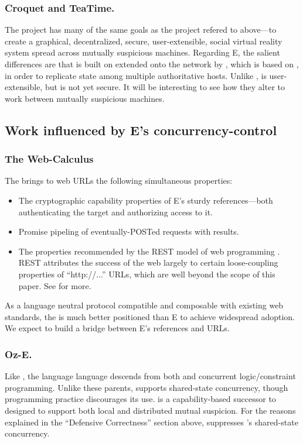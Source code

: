 \documentclass{llncs}
\begin{document}
\subsubsection{Croquet and TeaTime.} The  project has
many of the same goals as the  project refered to
above---to create a graphical, decentralized, secure, user-extensible,
social virtual reality system spread across mutually suspicious
machines. Regarding E, the salient differences are that 
is built on  extended onto the network by 
\cite{reed:namos}, which is based on  \cite{lamport:paxos},
in order to replicate state among multiple authoritative hosts. Unlike
,  is user-extensible, but is not yet
secure. It will be interesting to see how they alter  to
work between mutually suspicious machines.

\subsection{Work influenced by E's concurrency-control}

\subsubsection{The Web-Calculus} The  \cite{tyler:webcalc}
brings to web URLs the following simultaneous properties:
%
\begin{itemize}
\item The cryptographic capability properties of E's sturdy
  references---both authenticating the target and authorizing access
  to it.
\item Promise pipeling of eventually-POSTed requests with results.
\item The properties recommended by the REST model of web programming
  \cite{fielding:rest}. REST attributes the success of the web largely
  to certain loose-coupling properties of ``http://...''  URLs, which
  are well beyond the scope of this paper. See
  \cite{fielding:rest,tyler:webcalc} for more.
\end{itemize}
%
As a language neutral protocol compatible and composable with existing
web standards, the  is much better positioned than E
to achieve widespread adoption. We expect to build a bridge between
E's references and  URLs.

\subsubsection{Oz-E.} Like , the  language
\cite{VanRoyHaridi} language descends from both  and
concurrent logic/constraint programming. Unlike these parents,
 supports shared-state concurrency, though 
programming practice discourages its use.  \cite{oze} is a
capability-based successor to  designed to support both local
and distributed mutual suspicion. For the reasons explained in the
``Defensive Correctness'' section above,  suppresses
's shared-state concurrency.
\end{document}
